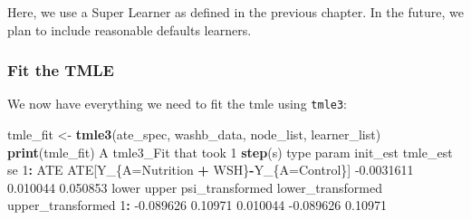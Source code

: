 \documentclass[12pt, krantz2,]{krantz}
\newenvironment{Shaded}{\begin{snugshade}}{\end{snugshade}}
\newcommand{\CommentTok}[1]{\textcolor[rgb]{0.37,0.37,0.37}{\textit{#1}}}
\newcommand{\DataTypeTok}[1]{\textcolor[rgb]{0.27,0.27,0.27}{#1}}
\newcommand{\DecValTok}[1]{\textcolor[rgb]{0.06,0.06,0.06}{#1}}
\newcommand{\FloatTok}[1]{\textcolor[rgb]{0.06,0.06,0.06}{#1}}
\newcommand{\KeywordTok}[1]{\textcolor[rgb]{0.27,0.27,0.27}{\textbf{#1}}}
\newcommand{\NormalTok}[1]{#1}
\newcommand{\OperatorTok}[1]{\textcolor[rgb]{0.43,0.43,0.43}{\textbf{#1}}}
\newcommand{\StringTok}[1]{\textcolor[rgb]{0.5,0.5,0.5}{#1}}
\theoremstyle{definition}
\theoremstyle{definition}
\theoremstyle{definition}
\newcommand{\1}{\mathbbm{1}}
\begin{document}
\begin{Shaded}
\end{Shaded}

Here, we use a Super Learner as defined in the previous chapter. In the future,
we plan to include reasonable defaults learners.

\hypertarget{fit-the-tmle}{%
\subsubsection{Fit the TMLE}\label{fit-the-tmle}}

We now have everything we need to fit the tmle using \texttt{tmle3}:

\begin{Shaded}
\begin{Highlighting}[]
\NormalTok{tmle_fit <-}\StringTok{ }\KeywordTok{tmle3}\NormalTok{(ate_spec, washb_data, node_list, learner_list)}
\KeywordTok{print}\NormalTok{(tmle_fit)}
\NormalTok{A tmle3_Fit that took }\DecValTok{1} \KeywordTok{step}\NormalTok{(s)}
\NormalTok{   type                                    param   init_est tmle_est       se}
\DecValTok{1}\OperatorTok{:}\StringTok{  }\NormalTok{ATE ATE[Y_\{A=Nutrition }\OperatorTok{+}\StringTok{ }\NormalTok{WSH\}}\OperatorTok{-}\NormalTok{Y_\{A=Control\}] }\FloatTok{-0.0031611} \FloatTok{0.010044} \FloatTok{0.050853}
\NormalTok{       lower   upper psi_transformed lower_transformed upper_transformed}
\DecValTok{1}\OperatorTok{:}\StringTok{ }\FloatTok{-0.089626} \FloatTok{0.10971}        \FloatTok{0.010044}         \FloatTok{-0.089626}           \FloatTok{0.10971}
\end{Highlighting}
\end{Shaded}
\end{document}
